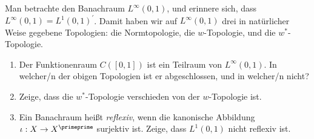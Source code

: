 \begin{exercise}

Man betrachte den Banachraum $L^\infty(0, 1)$, und erinnere sich, dass $L^\infty(0, 1) = L^1(0, 1)^\prime$.
Damit haben wir auf $L^\infty(0, 1)$ drei in natürlicher Weise gegebene Topologien:
die Normtopologie, die $w$-Topologie, und die $w^\ast$-Topologie.

\begin{enumerate}[label = \alph*)]

  \item
  Der Funktionenraum $C([0, 1])$ ist ein Teilraum von $L^\infty(0, 1)$.
  In welcher/n der obigen Topologien ist er abgeschlossen, und in welcher/n nicht?

  \item
  Zeige, dass die $w^\ast$-Topologie verschieden von der $w$-Topologie ist.

  \item
  Ein Banachraum heißt \textit{reflexiv}, wenn die kanonische Abbildung $\iota: X \rightarrow X^{\primeprime}$ surjektiv ist.
  Zeige, dass $L^1(0, 1)$ nicht reflexiv ist.

\end{enumerate}

\end{exercise}

